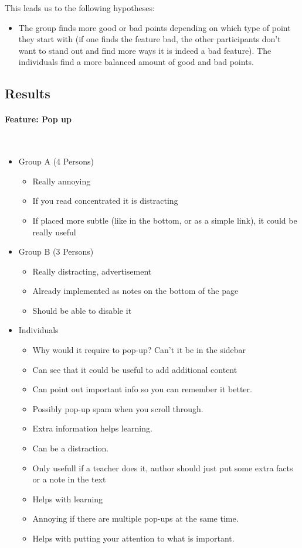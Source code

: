 \documentclass[main.tex]{subfiles}
\begin{document}
This leads us to the following hypotheses:
\begin{itemize}
\item The group finds more good or bad points depending on which type of point they start with (if one finds the feature bad, the other participants don't want to stand out and find more ways it is indeed a bad feature). The individuals find a more balanced amount of good and bad points.
\end{itemize}

\subsection{Results}
\paragraph{Feature: Pop up}~
\begin{itemize}
	\item Group A (4 Persons)
		\begin{itemize}
			\item Really annoying
			\item If you read concentrated it is distracting
			\item If placed more subtle (like in the bottom, or as a simple link), it could be really useful
		\end{itemize}
	\item Group B (3 Persons)
		\begin{itemize}
			\item Really distracting, advertisement
			\item Already implemented as notes on the bottom of the page
			\item Should be able to disable it
		\end{itemize}
	\item Individuals
		\begin{itemize}
      \item Why would it require to pop-up? Can't it be in the sidebar  %
      \item Can see that it could be useful to add additional content   %
			\item Can point out important info so you can remember it better.
			\item Possibly pop-up spam when you scroll through.
			\item Extra information helps learning.
			\item Can be a distraction.
			\item Only usefull if a teacher does it, author should just put some extra facts or a note in the text
			\item Helps with learning
			\item Annoying if there are multiple pop-ups at the same time.
			\item Helps with putting your attention to what is important.
		\end{itemize}
\end{itemize}
\end{document}
